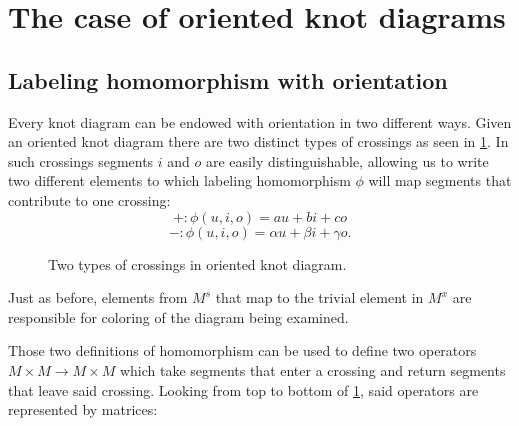 \section{The case of oriented knot diagrams}

\subsection{Labeling homomorphism with orientation}

Every knot diagram can be endowed with orientation in two different ways. Given an oriented knot diagram there are two distinct types of crossings as seen in \cref{fig:4:two:types:crossings}. In such crossings segments $i$ and $o$ are easily distinguishable, allowing us to write two different elements to which labeling homomorphism $\phi$ will map segments that contribute to one crossing:
$$+:\phi(u,i,o)=au+bi+co$$
$$-:\phi(u,i,o)=\alpha u+\beta i+\gamma o.$$

\begin{figure}[h]\centering
  \caption{\label{fig:4:two:types:crossings}Two types of crossings in oriented knot diagram.}
\end{figure}

Just as before, elements from $M^s$ that map to the trivial element in $M^x$ are responsible for coloring of the diagram being examined.

{\color{yellow}Those two definitions of homomorphism can be used to define two operators $M\times M\to M\times M$ which take segments that enter a crossing and return segments that leave said crossing. Looking from top to bottom of \cref{fig:4:two:types:crossings}, said operators are represented by matrices:}

